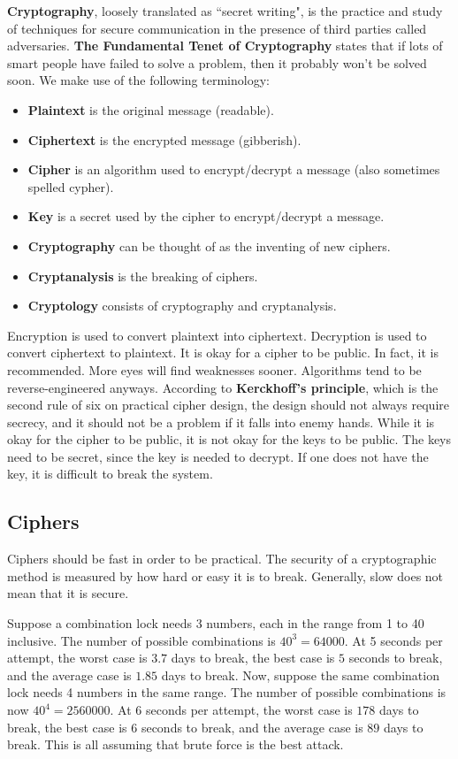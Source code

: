 \documentclass[11pt]{article}
\theoremstyle{plain} %
\theoremstyle{definition}
\theoremstyle{example}
\theoremstyle{remark}
\begin{document}
\textbf{Cryptography}, loosely translated as ``secret writing", is the practice and study of techniques for secure communication in the presence of third parties called adversaries. \textbf{The Fundamental Tenet of Cryptography} states that if lots of smart people have failed to solve a problem, then it probably won't be solved soon. We make use of the following terminology:
\begin{itemize}
	\item \textbf{Plaintext} is the original message (readable).
	\item \textbf{Ciphertext} is the encrypted message (gibberish).
	\item \textbf{Cipher} is an algorithm used to encrypt/decrypt a message (also sometimes spelled cypher). 
	\item \textbf{Key} is a secret used by the cipher to encrypt/decrypt a message.
	\item \textbf{Cryptography} can be thought of as the inventing of new ciphers.
	\item \textbf{Cryptanalysis} is the breaking of ciphers.
	\item \textbf{Cryptology} consists of cryptography and cryptanalysis.
\end{itemize}

Encryption is used to convert plaintext into ciphertext. Decryption is used to convert ciphertext to plaintext. It is okay for a cipher to be public. In fact, it is recommended. More eyes will find weaknesses sooner. Algorithms tend to be reverse-engineered anyways. According to \textbf{Kerckhoff's principle}, which is the second rule of six on practical cipher design, the design should not always require secrecy, and it should not be a problem if it falls into enemy hands. While it is okay for the cipher to be public, it is not okay for the keys to be public. The keys need to be secret, since the key is needed to decrypt. If one does not have the key, it is difficult to break the system. 

\subsection{Ciphers}

Ciphers should be fast in order to be practical. The security of a cryptographic method is measured by how hard or easy it is to break. Generally, slow does not mean that it is secure. 

Suppose a combination lock needs 3 numbers, each in the range from 1 to 40 inclusive. The number of possible combinations is $40^3 = 64000$. At 5 seconds per attempt, the worst case is $3.7$ days to break, the best case is $5$ seconds to break, and the average case is $1.85$ days to break. Now, suppose the same combination lock needs 4 numbers in the same range. The number of possible combinations is now $40^4 = 2560000$. At 6 seconds per attempt, the worst case is $178$ days to break, the best case is $6$ seconds to break, and the average case is $89$ days to break. This is all assuming that brute force is the best attack. 
\end{document}
